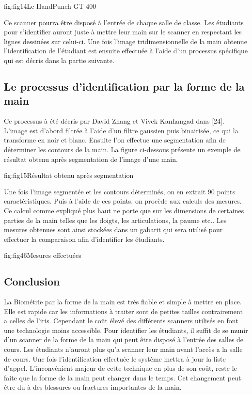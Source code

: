 \documentclass[overfullbox]{polytech/polytech}
\begin{document}
\begin{Figure}{fig:fig14}{Le HandPunch GT 400}
\end{Figure}

Ce scanner pourra être disposé à l'entrée de chaque salle de classe. Les étudiants pour s'identifier auront juste à mettre leur main sur le scanner en respectant les lignes dessinées sur celui-ci. Une fois l'image tridimensionnelle de la main obtenue l'identification de l'étudiant est ensuite effectuée à l'aide d'un processus spécifique qui est décris dans la partie suivante.

\subsection{Le processus d'identification par la forme de la main}
Ce processus à été décris par David Zhang et Vivek Kanhangad dans [24]. L'image est d'abord filtrée à l'aide d'un filtre gaussien puis binairisée, ce qui la transforme en noir et blanc. Ensuite l'on effectue une segmentation afin de déterminer les contours de la main. La figure ci-dessous présente un exemple de résultat obtenu après segmentation de l'image d'une main.

\begin{Figure}{fig:fig15}{Résultat obtenu après segmentation}
\end{Figure}


Une fois l'image segmentée et les contours déterminés, on en extrait 90 points caractéristiques. Puis à l'aide de ces points, on procède aux calculs des mesures. Ce calcul comme expliqué plus haut ne porte que sur les dimensions de certaines parties de la main telles que les doigts, les articulations, la paume etc.. Les mesures obtenues sont ainsi stockées dans un gabarit qui sera utilisé pour effectuer la comparaison afin d'identifier les étudiants.

\begin{Figure}{fig:fig46}{Mesures effectuées}
\end{Figure}


\subsection{Conclusion}

La Biométrie par la forme de la main est très fiable et simple à mettre en place. Elle est rapide car les informations à traiter sont de petites tailles contrairement a celles de l'iris. Cependant le coût élevé des différents scanners utilisés en font une technologie moins accessible. Pour identifier les étudiants, il suffit de se munir d'un scanner de la forme de la main qui peut être disposé à l'entrée des salles de cours. Les étudiants n'auront plus qu'a scanner leur main avant l'accès a la salle de cours. Une fois l'identification effectuée le système mettra à jour la liste d'appel. L'inconvénient majeur de cette technique en plus de son coût, reste le faite que la forme de la main peut changer dans le temps. Cet changement peut être du à des blessures ou fractures importantes de la main. 
\end{document}
